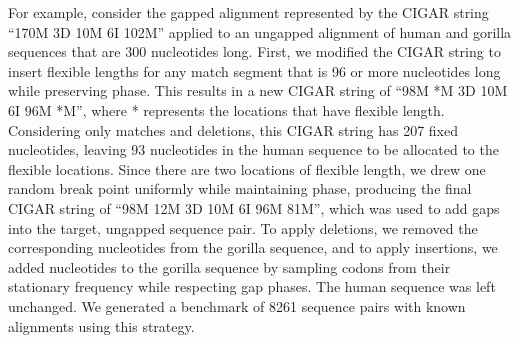 \documentclass[12pt,letterpaper]{article}
\begin{document}
For example, consider the gapped alignment represented by the CIGAR string
%
``170M 3D 10M 6I 102M'' %
%
applied to an ungapped alignment of human and gorilla sequences that are 300 nucleotides long. First, we modified the CIGAR string to insert flexible lengths for any match segment that is 96 or more nucleotides long while preserving phase. This results in a new CIGAR string of
%
``98M *M 3D 10M 6I 96M *M'',
%
where * represents the locations that have flexible length. Considering only matches and deletions, this CIGAR string has 207 fixed nucleotides, leaving 93 nucleotides in the human sequence to be allocated to the flexible locations. Since there are two locations of flexible length, we drew one random break point uniformly while maintaining phase, producing the final CIGAR string of
%
``98M 12M 3D 10M 6I 96M 81M'',
%
which was used to add gaps into the target, ungapped sequence pair.
To apply deletions, we removed the corresponding nucleotides from the gorilla sequence, and to apply insertions, we added nucleotides to the gorilla sequence by sampling codons from their stationary frequency while respecting gap phases. The human sequence was left unchanged.
%
We generated a benchmark of 8261 sequence pairs with known alignments using this strategy.


\end{document}
